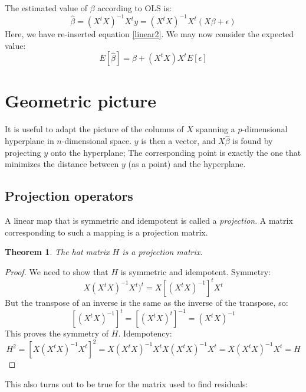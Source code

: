 \documentclass[12pt, a4paper]{article}
\newtheorem{theorem}{Theorem}
\begin{document}
The estimated value of $\beta$ according to OLS is:
\begin{equation}
\hat{\beta}=(X^t X)^{-1}X^t y=(X^t X)^{-1}X^t(X\beta+\epsilon)
\end{equation}
Here, we have re-inserted equation \ref{linear2}. We may now consider the expected value:
\begin{equation}
\label{ols_var}
E[\hat{\beta}]=\beta+(X^t X)X^t E[\epsilon]
\end{equation}



\section{Geometric picture}
It is useful to adapt the picture of the columns of $X$ spanning a $p$-dimensional hyperplane in $n$-dimensional space. $y$ is then a vector, and $X\hat{\beta}$ is found by projecting $y$ onto the hyperplane; The corresponding point is exactly the one that minimizes the distance between $y$ (as a point) and the hyperplane.

\subsection{Projection operators}
A linear map that is symmetric and idempotent is called a \textit{projection}. A matrix corresponding to such a mapping is a projection matrix.

\begin{theorem}
The hat matrix $H$ is a projection matrix.
\end{theorem}
\begin{proof}
We need to show that $H$ is symmetric and idempotent. Symmetry:
\begin{equation}
X(X^t X)^{-1}X^t)^t=X\left[(X^t X)^{-1}\right]^t X^t
\end{equation}
But the transpose of an inverse is the same as the inverse of the transpose, so:
\begin{equation}
\left[(X^t X)^{-1}\right]^t=\left[(X^t X)^t\right]^{-1}=(X^t X)^{-1}
\end{equation}
This proves the symmetry of $H$. Idempotency:
\begin{equation}
H^2=\left[X(X^t X)^{-1}X^t\right]^2=X(X^t X)^{-1}X^tX(X^t X)^{-1}X^t=X(X^t X)^{-1}X^t=H
\end{equation}
\end{proof}

This also turns out to be true for the matrix used to find residuals:
\end{document}
